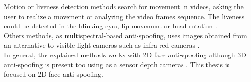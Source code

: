 Motion or liveness detection methods search for movement in videos, asking the user to realize a movement or analyzing the video frames sequence. The liveness could be detected in the blinking eyes, lip movement or head rotation \cite{distorsion,Spoofing_survey}.\\

Others methods, as multispectral-based anti-spoofing, uses images obtained from an alternative to visible light cameras such as infra-red cameras \cite{distorsion}.\\

In general, the explained methods works with 2D face anti-spoofing although 3D anti-spoofing is present too using as a sensor depth cameras \cite{2d_3d_face}. This thesis is focused on 2D face anti-spoofing.\\
